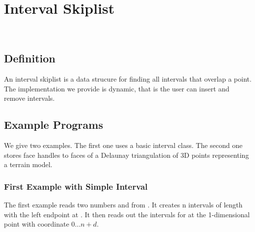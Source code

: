 

\ccParDims

\chapter{Interval Skiplist}
\label{chapter_Interval_skip_list}
\\




\section{Definition}
  
An interval skiplist is a data strucure for finding all intervals 
that overlap a point. The implementation we provide is dynamic, that
is the user can insert and remove intervals. 
 
\section{Example Programs}
\label{sectionIntervalskiplistExamples}

We give two examples. The first one uses a basic interval class.
The second one stores face handles to faces of a Delaunay
triangulation of 3D points representing a terrain model.

\subsection{First Example with Simple Interval}

The first example reads two numbers  and  from .
It creates n intervals of length  with the left endpoint at .
It then reads out the intervals for at the 1-dimensional point with
coordinate $0 ... n+d$. 


